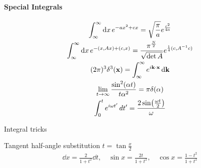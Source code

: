 \documentclass[main]{subfiles}
\begin{document}
\begin{multicols}{2}

\paragraph{Special Integrals}
\begin{gather}
\int^\infty_\infty\dd{x}e^{-ax^{2}+cx} = \sqrt{\frac{\pi}{a}}e^{\frac{c^2}{4a}}\\
\int^\infty_\infty\dd{x}e^{-(x,Ax)+(c,x)} = \frac{\pi^{\frac{N}{2}}}{\sqrt{\det A}} e^{\frac{1}{4}(c,A^{-1}c)}\\
(2\pi)^3\delta^3(\vb{x}) = \int_\infty^\infty e^{i\vb{k}\cdot \vb{x}}\dd{\vb{k}}
\\
\lim_{t\rightarrow \infty}
\frac{\sin^2(\alpha t)}{t\alpha^2} = \pi \delta(\alpha)
\\
\int_0^t e^{i\omega t'} \,dt' = \frac{2\sin(\frac{\omega t}{2})}{\omega}
\end{gather}
\end{multicols}

Integral tricks
\begin{multicols}{2}
    Tangent half-angle substitution $t = \tan \frac{x}{2}$
    \begin{gather*}
        \dd x = \frac{2}{1 + t^2}\dd t,\quad \sin{x} = \frac{2t}{1 + t^2},\quad \cos{x} = \frac{1 - t^2}{1 + t^2}
    \end{gather*}
\end{multicols}
\end{document}
